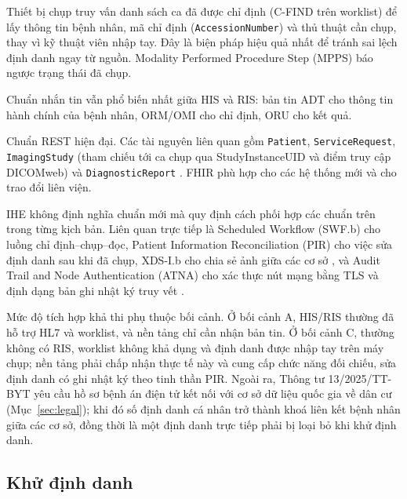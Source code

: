 \begin{description}[leftmargin=2.6cm,style=nextline]
\item[Modality Worklist] Thiết bị chụp truy vấn danh sách ca đã được chỉ định
      (C-FIND trên worklist) để lấy thông tin bệnh nhân, mã chỉ định
      (\texttt{AccessionNumber}) và thủ thuật cần chụp, thay vì kỹ thuật viên
      nhập tay. Đây là biện pháp hiệu quả nhất để tránh sai lệch định danh ngay
      từ nguồn. Modality Performed Procedure Step (MPPS) báo ngược trạng thái
      đã chụp.
\item[HL7 v2] Chuẩn nhắn tin vẫn phổ biến nhất giữa HIS và RIS: bản tin ADT cho
      thông tin hành chính của bệnh nhân, ORM/OMI cho chỉ định, ORU cho kết
      quả.
\item[HL7 FHIR] Chuẩn REST hiện đại. Các tài nguyên liên quan gồm
      \texttt{Patient}, \texttt{ServiceRequest}, \texttt{ImagingStudy} (tham
      chiếu tới ca chụp qua StudyInstanceUID và điểm truy cập DICOMweb) và
      \texttt{DiagnosticReport} \cite{hl7fhir}. FHIR phù hợp cho các hệ thống
      mới và cho trao đổi liên viện.
\item[Hồ sơ IHE] IHE không định nghĩa chuẩn mới mà quy định cách phối hợp các
      chuẩn trên trong từng kịch bản. Liên quan trực tiếp là Scheduled
      Workflow (SWF.b) cho luồng chỉ định--chụp--đọc, Patient Information
      Reconciliation (PIR) cho việc sửa định danh sau khi đã chụp, XDS-I.b cho
      chia sẻ ảnh giữa các cơ sở \cite{iherad}, và Audit Trail and Node
      Authentication (ATNA) cho xác thực nút mạng bằng TLS và định dạng bản ghi
      nhật ký truy vết \cite{iheiti}.
\end{description}

Mức độ tích hợp khả thi phụ thuộc bối cảnh. Ở bối cảnh A, HIS/RIS thường đã hỗ
trợ HL7 và worklist, và nền tảng chỉ cần nhận bản tin. Ở bối cảnh C, thường không
có RIS, worklist không khả dụng và định danh được nhập tay trên máy chụp; nền tảng
phải chấp nhận thực tế này và cung cấp chức năng đối chiếu, sửa định danh có ghi
nhật ký theo tinh thần PIR. Ngoài ra, Thông tư 13/2025/TT-BYT yêu cầu hồ sơ bệnh
án điện tử kết nối với cơ sở dữ liệu quốc gia về dân cư (Mục~\ref{sec:legal}); khi
đó số định danh cá nhân trở thành khoá liên kết bệnh nhân giữa các cơ sở, đồng thời
là một định danh trực tiếp phải bị loại bỏ khi khử định danh.

\subsection{Khử định danh}
\label{sec:deid}

